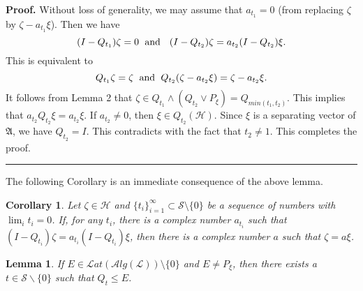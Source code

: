 \documentclass[12pt]{article}
\newtheorem{corollary}[theorem]{Corollary}
\newtheorem{lemma}[theorem]{Lemma}
\newenvironment{proof}[1][Proof]{\textbf{#1.} }{\ \rule{0.5em}{0.5em}}
\def\Lat{{\mathcal Lat}}\def\Alg{{\mathcal Alg}}
\newcommand{\AAA}{\mathfrak A}
\newcommand{\HHH}{\mathscr H} %
\newcommand{\LLL}{\mathscr L} %
\newcommand{\SSS}{\mathcal S}
\newcommand{\PP}[1]{ P_{#1}} %
\newcommand{\QQ}[1]{ Q_{#1}}
\def\Lat{\mathcal Lat}
\def\Alg{\mathcal Alg}
\begin{document}
\noindent\begin{proof} Without loss of generality, we may assume
that $a_{t_1} = 0$ (from replacing $\zeta$ by $ \zeta-a_{t_1}\xi$).
Then we have
$$
      (I - \QQ {t_1})\zeta = 0  \hskip6pt \mbox{and }\hskip6pt
      (I - \QQ {t_2})\zeta = a_{t_2}(I - \QQ {t_2})\xi.
  $$This is equivalent to $$
      \QQ {t_1}\zeta = \zeta  \hskip6pt\mbox{and}\hskip6pt
      \QQ {t_2}(\zeta - a_{t_2}\xi) = \zeta - a_{t_2}\xi.    $$
It follows from Lemma 2 that $\zeta \in \QQ {t_1} \wedge (\QQ {t_2}
\vee \PP {\xi}) = \QQ {min(t_1, t_2)}$. This implies that
$a_{t_2}\QQ {t_2}\xi = a_{t_2} \xi$. If $a_{t_2} \neq 0$, then $\xi
\in \QQ {t_2}(\HHH)$. Since $\xi$ is a separating vector of $\AAA$,
we have $\QQ{t_2}=I$. This contradicts with the fact that $t_2\neq
1$. This completes the proof.
\end{proof}\newline

The following Corollary is an immediate consequence of the above
lemma.

\begin{corollary}
Let $\zeta \in \HHH$ and $\{t_i\}_{i=1}^{\infty} \subset \SSS
\setminus \{ 0 \}$ be a sequence of numbers with $\lim_{i} t_i = 0$.
If, for any $t_i$, there is a complex number $a_{t_i}$ such that $(I
- \QQ {t_i})\zeta = a_{t_i}(I - \QQ {t_i}) \xi$, then there is a
complex number $a$ such that $\zeta = a\xi$.
\end{corollary}

\begin{lemma}
If $E \in \Lat(\Alg(\LLL)) \setminus \{0 \}$ and $E \neq \PP {\xi}$,
then there exists a $t \in \SSS\backslash \{0\}$ such that $\QQ {t}
\leq E$.
\end{lemma}
\end{document}
